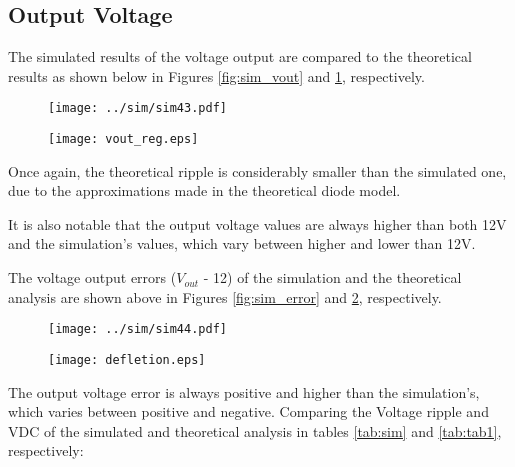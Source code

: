 \subsection{Output Voltage}
The simulated results of the voltage output are compared to the theoretical results as shown below in Figures \ref{fig:sim_vout} and \ref{fig:theo_vout}, respectively.

\begin{figure} [h]
\centering
\begin{minipage}{.5\textwidth}
  \centering
  \texttt{[image: ../sim/sim43.pdf]}
  \label{fig:sim_vout}
\end{minipage}%
\begin{minipage}{.5\textwidth}
  \centering
  \texttt{[image: vout\_reg.eps]}
  \label{fig:theo_vout}
\end{minipage}
\end{figure}

Once again, the theoretical ripple is considerably smaller than the simulated one, due to the approximations made in the theoretical diode model.

It is also notable that the output voltage values are always higher than both 12V and the simulation's values, which vary between higher and lower than 12V.  

The voltage output errors ($V_{out}$ - 12) of the simulation and the theoretical analysis are shown above in Figures \ref{fig:sim_error} and \ref{fig:theo_error}, respectively.


\begin{figure}
\centering
\begin{minipage}{.5\textwidth}
  \centering
  \texttt{[image: ../sim/sim44.pdf]}
  \label{fig:sim_error}
\end{minipage}%
\begin{minipage}{.5\textwidth}
  \centering
  \texttt{[image: defletion.eps]}
  \label{fig:theo_error}
\end{minipage}
\end{figure}

\pagebreak The output voltage error is always positive and higher than the simulation's, which varies between positive and negative.
Comparing the Voltage ripple and VDC of the simulated and theoretical analysis in tables \ref{tab:sim} and \ref{tab:tab1}, respectively:

